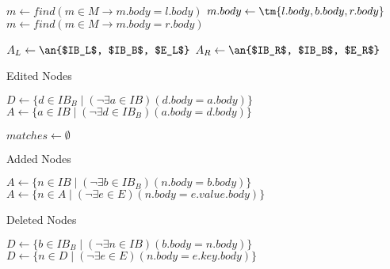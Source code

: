 \documentclass[../../Algorithms.tex]{subfiles}
\begin{document}
\begin{algorithm}[H]
{{                \BlankLine
                $m \leftarrow find(m \in M \rightarrow m.body = l.body)$\;
                $m.body \leftarrow \tm{l.body, b.body, r.body}$\;
                $m \leftarrow find(m \in M \rightarrow m.body = r.body)$\;
            }

            \BlankLine
            \;
        }

        \BlankLine
        $A_L \leftarrow \an{$IB_L$, $IB_B$, $E_L$}$\;
        $A_R \leftarrow \an{$IB_R$, $IB_B$, $E_R$}$\;
    \end{algorithm}

    \begin{algorithm}[H]
        \caption{Edited Nodes}



        \BlankLine
        $D \leftarrow \{d \in IB_B \mid (\lnot \exists a \in IB)(d.body = a.body)\}$\;
        $A \leftarrow \{a \in IB \mid (\lnot \exists d \in IB_B)(a.body = d.body)\}$\;

        \BlankLine
        $matches \leftarrow \emptyset$\;

        \BlankLine
    \end{algorithm}

    \begin{algorithm}[H]
        \caption{Added Nodes}


        \BlankLine
        $A \leftarrow \{n \in IB \mid (\lnot \exists b \in IB_B)(n.body = b.body)\}$\;
        $A \leftarrow \{n \in A \mid (\lnot \exists e \in E)(n.body = e.value.body)\}$\;
        \;
    \end{algorithm}

    \begin{algorithm}[H]
        \caption{Deleted Nodes}


        \BlankLine
        $D \leftarrow \{b \in IB_B \mid (\lnot \exists n \in IB)(b.body = n.body)\}$\;
        $D \leftarrow \{n \in D \mid (\lnot \exists e \in E)(n.body = e.key.body)\}$\;
        \;
    \end{algorithm}
\end{document}
